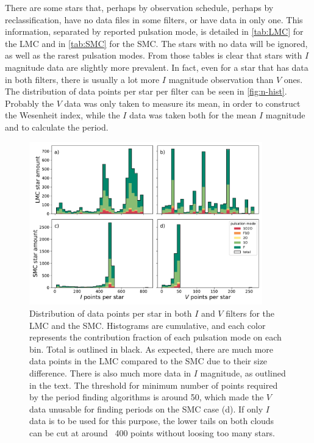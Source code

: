 
There are some stars that, perhaps by observation schedule, perhaps by reclassification, have no data files in some filters, or have data in only one.
This information, separated by reported pulsation mode, is detailed in \autoref{tab:LMC} for the LMC and in \autoref{tab:SMC} for the SMC.
The stars with no data will be ignored, as well as the rarest pulsation modes.
From those tables is clear that stars with $I$ magnitude data are slightly more prevalent.
In fact, even for a star that has data in both filters, there is usually a lot more $I$ magnitude observation than $V$ ones.
The distribution of data points per star per filter can be seen in \autoref{fig:n-hist}.
Probably the $V$ data was only taken to measure its mean, in order to construct the Wesenheit index,
while the $I$ data was taken both for the mean $I$ magnitude and to calculate the period.

\begin{figure}
	\centering
	\includegraphics[width=0.9\textwidth]{img/clouds_histogram_ns.pdf}
	\caption[Distribution of data size for classical Cepheids in the Magellanic clouds]{
		Distribution of data points per star in both $I$ and $V$ filters for the LMC and the SMC. 
		Histograms are cumulative, and each color represents the contribution fraction of each pulsation mode on each bin.
		Total is outlined in black.
		As expected, there are much more data points in the LMC compared to the SMC due to their size difference.
		There is also much more data in $I$ magnitude, as outlined in the text.
		The threshold for minimum number of points required by the period finding algorithms is around 50,
		which made the $V$ data unusable for finding periods on the SMC case (d).
		If only $I$ data is to be used for this purpose, 
		the lower tails on both clouds can be cut at around ~400 points without loosing too many stars.
	}
	\label{fig:n-hist}
\end{figure}



